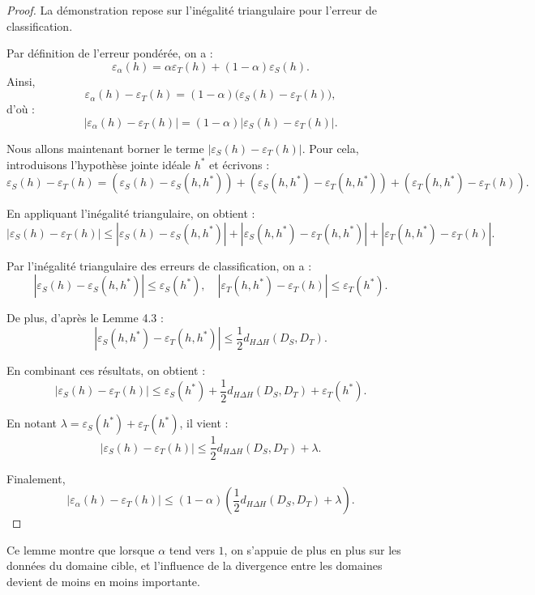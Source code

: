 \documentclass[a4paper,12pt]{article}
\theoremstyle{definition}
\theoremstyle{remark}
\begin{document}
\begin{proof}
La démonstration repose sur l’inégalité triangulaire pour l’erreur de classification.

Par définition de l’erreur pondérée, on a :
\[
\varepsilon_\alpha(h) = \alpha \varepsilon_T(h) + (1 - \alpha)\varepsilon_S(h).
\]
Ainsi,
\[
\varepsilon_\alpha(h) - \varepsilon_T(h)
= (1 - \alpha)\big(\varepsilon_S(h) - \varepsilon_T(h)\big),
\]
d’où :
\[
\left| \varepsilon_\alpha(h) - \varepsilon_T(h) \right|
= (1 - \alpha)\left| \varepsilon_S(h) - \varepsilon_T(h) \right|.
\]

Nous allons maintenant borner le terme $|\varepsilon_S(h) - \varepsilon_T(h)|$.
Pour cela, introduisons l’hypothèse jointe idéale $h^*$ et écrivons :
\[
\varepsilon_S(h) - \varepsilon_T(h)
= (\varepsilon_S(h) - \varepsilon_S(h,h^*))
+ (\varepsilon_S(h,h^*) - \varepsilon_T(h,h^*))
+ (\varepsilon_T(h,h^*) - \varepsilon_T(h)).
\]

En appliquant l’inégalité triangulaire, on obtient :
\[
|\varepsilon_S(h) - \varepsilon_T(h)|
\leq |\varepsilon_S(h) - \varepsilon_S(h,h^*)|
+ |\varepsilon_S(h,h^*) - \varepsilon_T(h,h^*)|
+ |\varepsilon_T(h,h^*) - \varepsilon_T(h)|.
\]

Par l’inégalité triangulaire des erreurs de classification, on a :
\[
|\varepsilon_S(h) - \varepsilon_S(h,h^*)| \leq \varepsilon_S(h^*),
\quad
|\varepsilon_T(h,h^*) - \varepsilon_T(h)| \leq \varepsilon_T(h^*).
\]

De plus, d’après le Lemme 4.3 :
\[
|\varepsilon_S(h,h^*) - \varepsilon_T(h,h^*)|
\leq \frac{1}{2} d_{H \Delta H}(D_S, D_T).
\]

En combinant ces résultats, on obtient :
\[
|\varepsilon_S(h) - \varepsilon_T(h)|
\leq \varepsilon_S(h^*) + \frac{1}{2} d_{H \Delta H}(D_S, D_T) + \varepsilon_T(h^*).
\]

En notant $\lambda = \varepsilon_S(h^*) + \varepsilon_T(h^*)$, il vient :
\[
|\varepsilon_S(h) - \varepsilon_T(h)|
\leq \frac{1}{2} d_{H \Delta H}(D_S, D_T) + \lambda.
\]

Finalement,
\[
\left| \varepsilon_\alpha(h) - \varepsilon_T(h) \right|
\leq (1 - \alpha)\left( \frac{1}{2} d_{H \Delta H}(D_S, D_T) + \lambda \right).
\]
\end{proof}




Ce lemme montre que lorsque $\alpha$ tend vers $1$, on s’appuie de plus en plus sur les
données du domaine cible, et l’influence de la divergence entre les domaines devient
de moins en moins importante.
\end{document}
